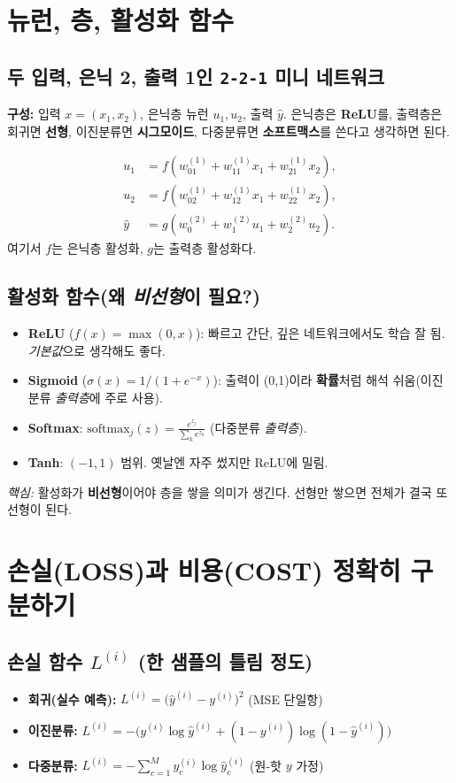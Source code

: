 \documentclass[12pt]{article}
\begin{document}
\section{뉴런, 층, 활성화 함수}
\subsection{두 입력, 은닉 2, 출력 1인 \texttt{2-2-1} 미니 네트워크}
\textbf{구성:}
입력 $x = (x_1, x_2)$, 은닉층 뉴런 $u_1,u_2$, 출력 $\hat{y}$.
은닉층은 \textbf{ReLU}를, 출력층은 회귀면 \textbf{선형}, 이진분류면 \textbf{시그모이드}, 다중분류면 \textbf{소프트맥스}를 쓴다고 생각하면 된다.

\[
\begin{aligned}
u_1 &= f\!\left(w^{(1)}_{01} + w^{(1)}_{11}x_1 + w^{(1)}_{21}x_2\right),\\
u_2 &= f\!\left(w^{(1)}_{02} + w^{(1)}_{12}x_1 + w^{(1)}_{22}x_2\right),\\
\hat{y} &= g\!\left(w^{(2)}_0 + w^{(2)}_1 u_1 + w^{(2)}_2 u_2\right).
\end{aligned}
\]
여기서 $f$는 은닉층 활성화, $g$는 출력층 활성화다.

\subsection{활성화 함수(왜 \emph{비선형}이 필요?)}
\begin{itemize}
  \item \textbf{ReLU} ($f(x)=\max(0,x)$): 빠르고 간단, 깊은 네트워크에서도 학습 잘 됨. \emph{기본값}으로 생각해도 좋다.
  \item \textbf{Sigmoid} ($\sigma(x)=1/(1+e^{-x})$): 출력이 (0,1)이라 \textbf{확률}처럼 해석 쉬움(이진분류 \textit{출력층}에 주로 사용).
  \item \textbf{Softmax}: $\displaystyle \text{softmax}_j(z)=\frac{e^{z_j}}{\sum_k e^{z_k}}$ (다중분류 \textit{출력층}).
  \item \textbf{Tanh}: $(-1,1)$ 범위. 옛날엔 자주 썼지만 ReLU에 밀림.
\end{itemize}
\textit{핵심:} 활성화가 \textbf{비선형}이어야 층을 쌓을 의미가 생긴다. 선형만 쌓으면 전체가 결국 또 선형이 된다.

\section{손실(LOSS)과 비용(COST) 정확히 구분하기}
\subsection{손실 함수 $L^{(i)}$ (한 샘플의 틀림 정도)}
\begin{itemize}
  \item \textbf{회귀(실수 예측):} \(\displaystyle L^{(i)} = \big(\hat{y}^{(i)}-y^{(i)}\big)^2\) (MSE 단일항)
  \item \textbf{이진분류:} \(\displaystyle L^{(i)} = -\big(y^{(i)}\log\hat{y}^{(i)} + (1-y^{(i)})\log(1-\hat{y}^{(i)})\big)\)
  \item \textbf{다중분류:} \(\displaystyle L^{(i)} = -\sum_{c=1}^M y_c^{(i)} \log \hat{y}_c^{(i)}\) (원-핫 $y$ 가정)
\end{itemize}
\end{document}
